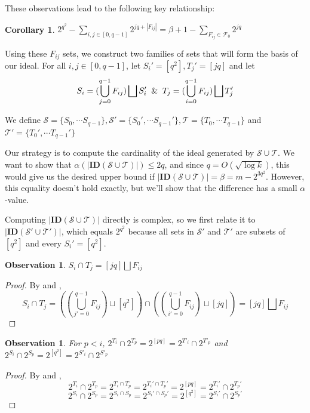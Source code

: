 \documentclass[11pt,a4paper]{article}
\newtheorem{observation}[theorem]{Observation}
\newtheorem{corollary}[theorem]{Corollary}
\theoremstyle{definition}
\begin{document}
These observations lead to the following key relationship:

\begin{corollary}\label{fij_beta}
	$2^{q^2}-\sum\limits_{i,j \in [0,q-1]} 2^{jq+|F_{ij}|}= \beta +1 - 
	\sum\limits_{F_{ij}\in \mathcal{F}_0} 2^{jq}$     
\end{corollary}

Using these $F_{ij}$ sets, we construct two families of sets that will form 
the basis of our ideal. For all $i,j \in [0,q-1]$, let $S_i'=[q^2], 
T_j'=[jq]$ and let  
$$S_i=(\bigcup_{j=0}^{q-1}F_{ij}) \bigsqcup S_i' \And T_j=
(\bigcup_{i=0}^{q-1}F_{ij}) \bigsqcup T_j'$$

We define $\mathcal{S}=\{S_0,\cdots S_{q-1}\}, \mathcal{S}'=\{S_0',\cdots 
S_{q-1}'\}, \mathcal{T}=\{T_0,\cdots T_{q-1} \}$ and $\mathcal{T}'=
\{T_0',\cdots T_{q-1}' \}$

Our strategy is to compute the cardinality of the ideal generated by 
$\mathcal{S}\cup \mathcal{T}$. We want to show that $\alpha(|\mathbf{ID} 
(\mathcal{S}\cup \mathcal{T})|) \leq 2q$, and since $q = O(\sqrt{\log k})$, 
this would give us the desired upper bound if $|\mathbf{ID} (\mathcal{S}\cup 
\mathcal{T})| = \beta = m-2^{3q^2}$. However, this equality doesn't hold 
exactly, but we'll show that the difference has a small $\alpha$-value.

Computing $|\mathbf{ID}(\mathcal{S}\cup \mathcal{T})|$ directly is complex, 
so we first relate it to $|\mathbf{ID}(\mathcal{S}'\cup \mathcal{T}')|$, 
which equals $2^{q^2}$ because all sets in $\mathcal{S}'$ and $\mathcal{T}'$ 
are subsets of $[q^2]$ and every $S_i' = [q^2]$.

\begin{observation}\label{obs_fij_simp}
	$S_i \cap T_j = [jq]\bigsqcup F_{ij}$
\end{observation}

\begin{proof}
	By  and , 
	$$S_i \cap T_j = ((\bigcup_{j'=0}^{q-1}F_{ij}) \sqcup [q^2]) \cap 
	((\bigcup_{i'=0}^{q-1}F_{ij}) \sqcup [jq])= [jq]\bigsqcup F_{ij} $$
\end{proof}

\begin{observation}\label{bastwosetsyseq}
	For $p < i$, $2^{T_i} \cap 2^{T_p}= 2^{[pq]}= 2^{T'_i} \cap 2^{T'_p}$ and 
	$2^{S_i} \cap 2^{S_p}= 2^{[q^2]}=2^{S'_i} \cap 2^{S'_p}$
\end{observation} 

\begin{proof}
	By  and , 
	$$2^{T_i} \cap 2^{T_p} = 2^{T_i \cap T_p}= 2^{T_i' \cap T_p'}= 2^{[pq]} = 
	2^{T_i'} \cap 2^{T_p'} $$
	$$2^{S_i} \cap 2^{S_p} = 2^{S_i \cap S_p}=2^{S_i' \cap S_p'}= 2^{[q^2]} = 
	2^{S_i'} \cap 2^{S_p'} $$
\end{proof}
\end{document}
